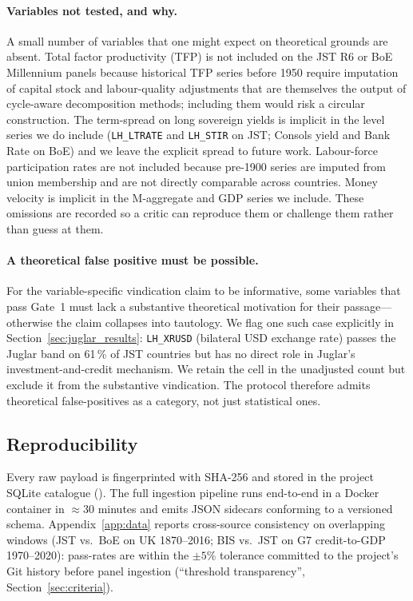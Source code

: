 \paragraph{Variables not tested, and why.}
A small number of variables that one might expect on theoretical
grounds are absent. Total factor productivity (TFP) is not
included on the JST R6 or BoE Millennium panels because
historical TFP series before 1950 require imputation of capital
stock and labour-quality adjustments that are themselves the
output of cycle-aware decomposition methods; including them
would risk a circular construction. The term-spread on long
sovereign yields is implicit in the level series we do include
(\texttt{LH\_LTRATE} and \texttt{LH\_STIR} on JST; Consols
yield and Bank Rate on BoE) and we leave the explicit spread to
future work. Labour-force participation rates are not included
because pre-1900 series are imputed from union membership and
are not directly comparable across countries. Money velocity is
implicit in the M-aggregate and GDP series we include. These
omissions are recorded so a critic can reproduce them or
challenge them rather than guess at them.

\paragraph{A theoretical false positive must be possible.}
For the variable-specific vindication claim to be informative,
some variables that pass Gate~1 must lack a substantive
theoretical motivation for their passage---otherwise the claim
collapses into tautology. We flag one such case explicitly in
Section~\ref{sec:juglar_results}: \texttt{LH\_XRUSD} (bilateral
USD exchange rate) passes the Juglar band on 61\,\% of JST
countries but has no direct role in Juglar's
investment-and-credit mechanism. We retain the cell in the
unadjusted count but exclude it from the substantive
vindication. The protocol therefore admits theoretical
false-positives as a category, not just statistical ones.

\subsection{Reproducibility}
\label{sec:repro}

Every raw payload is fingerprinted with SHA-256 and stored in the
project SQLite catalogue (). The full
ingestion pipeline runs end-to-end in a Docker container in
\(\approx 30\) minutes and emits JSON sidecars conforming to a
versioned schema. Appendix~\ref{app:data} reports cross-source
consistency on overlapping windows (JST vs.\ BoE on UK 1870--2016;
BIS vs.\ JST on G7 credit-to-GDP 1970--2020): pass-rates are within
the \(\pm 5\%\) tolerance committed to the project's Git
history before panel ingestion (``threshold transparency'',
Section~\ref{sec:criteria}).

